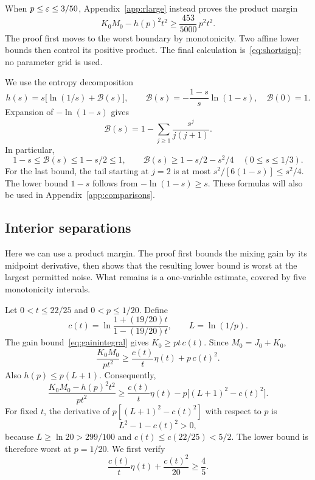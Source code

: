 When $p\le\varepsilon\le3/50$, Appendix~\ref{app:rlarge} instead proves the product margin
\begin{equation}\label{eq:endpointproduct}
K_0M_0-h(p)^2t^2\ge\frac{453}{5000}\,p^2t^2.
\end{equation}
The proof first moves to the worst boundary by monotonicity. Two affine lower bounds then control its positive product. The final calculation is~\eqref{eq:shortsign}; no parameter grid is used.


We use the entropy decomposition
\begin{equation}\label{eq:entropyremainder}
h(s)=s\bigl[\ln(1/s)+\mathcal B(s)\bigr],\qquad
\mathcal B(s)=-\frac{1-s}{s}\ln(1-s),\quad \mathcal B(0)=1.
\end{equation}
Expansion of $-\ln(1-s)$ gives
\begin{equation}\label{eq:Bseries}
\mathcal B(s)=1-\sum_{j\ge1}\frac{s^j}{j(j+1)}.
\end{equation}
In particular,
\begin{equation}\label{eq:Bbounds}
1-s\le\mathcal B(s)\le1-s/2\le1,
\qquad
\mathcal B(s)\ge1-s/2-s^2/4\quad(0\le s\le1/3).
\end{equation}
For the last bound, the tail starting at $j=2$ is at most $s^2/[6(1-s)]\le s^2/4$. The lower bound $1-s$ follows from $-\ln(1-s)\ge s$. These formulas will also be used in Appendix~\ref{app:comparisons}.

\subsection{Interior separations}\label{app:interior}
Here we can use a product margin. The proof first bounds the mixing gain by its midpoint derivative, then shows that the resulting lower bound is worst at the largest permitted noise. What remains is a one-variable estimate, covered by five monotonicity intervals.

Let $0<t\le22/25$ and $0<p\le1/20$. Define
\[
c(t)=\ln\frac{1+(19/20)t}{1-(19/20)t},\qquad L=\ln(1/p).
\]
The gain bound~\eqref{eq:gainintegral} gives $K_0\ge pt\,c(t)$. Since $M_0=J_0+K_0$,
\begin{equation}\label{eq:productinterior}
\frac{K_0M_0}{pt^2}\ge\frac{c(t)}t\eta(t)+p\,c(t)^2.
\end{equation}
Also $h(p)\le p(L+1)$. Consequently,
\[
\frac{K_0M_0-h(p)^2t^2}{pt^2}\ge\frac{c(t)}t\eta(t)-p\bigl[(L+1)^2-c(t)^2\bigr].
\]
For fixed $t$, the derivative of $p[(L+1)^2-c(t)^2]$ with respect to $p$ is
\[
L^2-1-c(t)^2>0,
\]
because $L\ge\ln20>299/100$ and $c(t)\le c(22/25)<5/2$. The lower bound is therefore worst at $p=1/20$. We first verify
\begin{equation}\label{eq:tabletarget}
\frac{c(t)}t\eta(t)+\frac{c(t)^2}{20}\ge\frac45.
\end{equation}

